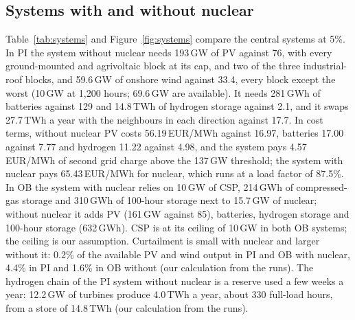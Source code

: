 \subsection{Systems with and without nuclear}\label{sec:systems}
Table~\ref{tab:systems} and Figure~\ref{fig:systems} compare the central systems at 5\%. In PI the system without nuclear needs 193\,GW of PV against 76, with every ground-mounted and agrivoltaic block at its cap, and two of the three industrial-roof blocks, and 59.6\,GW of onshore wind against 33.4, every block except the worst (10\,GW at 1{,}200 hours; 69.6\,GW are available). It needs 281\,GWh of batteries against 129 and 14.8\,TWh of hydrogen storage against 2.1, and it swaps 27.7\,TWh a year with the neighbours in each direction against 17.7. In cost terms, without nuclear PV costs 56.19\,EUR/MWh against 16.97, batteries 17.00 against 7.77 and hydrogen 11.22 against 4.98, and the system pays 4.57\,EUR/MWh of second grid charge above the 137\,GW threshold; the system with nuclear pays 65.43\,EUR/MWh for nuclear, which runs at a load factor of 87.5\%. In OB the system with nuclear relies on 10\,GW of CSP, 214\,GWh of compressed-gas storage and 310\,GWh of 100-hour storage next to 15.7\,GW of nuclear; without nuclear it adds PV (161\,GW against 85), batteries, hydrogen storage and 100-hour storage (632\,GWh). CSP is at its ceiling of 10\,GW in both OB systems; the ceiling is our assumption. Curtailment is small with nuclear and larger without it: 0.2\% of the available PV and wind output in PI and OB with nuclear, 4.4\% in PI and 1.6\% in OB without (our calculation from the runs). The hydrogen chain of the PI system without nuclear is a reserve used a few weeks a year: 12.2\,GW of turbines produce 4.0\,TWh a year, about 330 full-load hours, from a store of 14.8\,TWh (our calculation from the runs).

